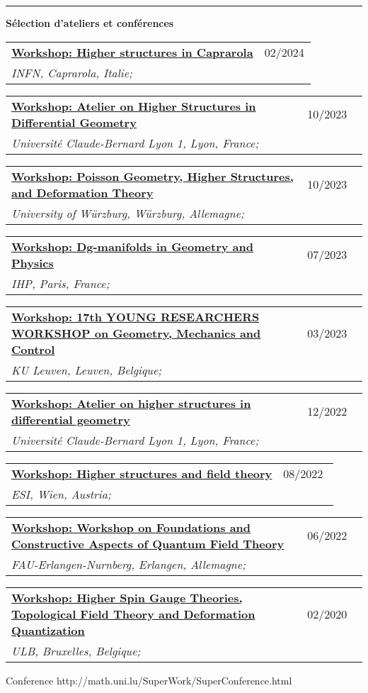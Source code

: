 \documentclass[a4paper]{article}
\newcommand{\block}[1]{\hrule \vspace{0.2cm} \textbf{\Large #1} \vspace{0.2cm}}
\newcommand{\longvoice}[8]{
    \begin{tabular}{p{0.83\linewidth} p{0.17\linewidth} }
        \textbf{\href{#3}{#2: #1}} & #4 
        \\ 
        \textit{#5, #6, #7;} & {\small\emph{#8}}
    \end{tabular}
    \vspace{.5em}
    }
\begin{document}
 


    \block{Sélection d'ateliers et conférences}


    \longvoice{Higher structures in Caprarola}
        {Workshop}
        {http://wpage.unina.it/francesco.dandrea/Caprarola2024/index.html}
        {02/2024}
        {INFN}
        {Caprarola}
        {Italie}
        {}
    \longvoice{Atelier on Higher Structures in Differential Geometry}
        {Workshop}
        {https://ryvkin.eu/hs2023/index.html}
        {10/2023}
        {Université Claude-Bernard Lyon 1}
        {Lyon}
        {France}
        {}
    \longvoice{Poisson Geometry, Higher Structures, and Deformation Theory}
        {Workshop}
        {https://www.mathematik.uni-wuerzburg.de/mathematicalphysics/forschung/veranstaltungen/workshops-und-konferenzen/single/news/poisson-geometry-higher-structures-and-deformation-theory/}
        {10/2023}
        {University of Würzburg}
        {Würzburg}
        {Allemagne}
        {}
    \longvoice{Dg-manifolds in Geometry and Physics}
        {Workshop}
        {https://indico.math.cnrs.fr/event/7885/}
        {07/2023}
        {IHP}
        {Paris}
        {France}
        {}
    \longvoice{17th YOUNG RESEARCHERS WORKSHOP on Geometry, Mechanics and Control}
        {Workshop}
        {https://wis.kuleuven.be/events/young-researchers-workshop2023/young-researchers-workshop2023}
        {03/2023}
        {KU Leuven}
        {Leuven}
        {Belgique}
        {}
    \longvoice{Atelier on higher structures in differential geometry}
        {Workshop}
        {https://ryvkin.eu/atelier2022/}
        {12/2022}
        {Université Claude-Bernard Lyon 1}
        {Lyon}
        {France}
        {}
    \longvoice{Higher structures and field theory}
        {Workshop}
        {https://www.esi.ac.at/events/e430/}
        {08/2022}
        {ESI}
        {Wien}
        {Austria}
        {}
    \longvoice{Workshop on Foundations and Constructive Aspects of Quantum Field Theory}
        {Workshop}
        {https://en.www.math.fau.de/mathematical-physics/gandalf-lechner/events10056/workshop-lqp46/}
        {06/2022}
        {FAU-Erlangen-Nurnberg}
        {Erlangen}
        {Allemagne}
        {}
    \longvoice{Higher Spin Gauge Theories, Topological Field Theory and Deformation Quantization}
        {Workshop}
        {http://www.solvayinstitutes.be/event/workshop/higher_spin_2020/higher_spin_2020.html}
        {02/2020}
        {ULB}
        {Bruxelles}
        {Belgique}
        {}
        {Conference}
        {http://math.uni.lu/SuperWork/SuperConference.html}
\end{document}
